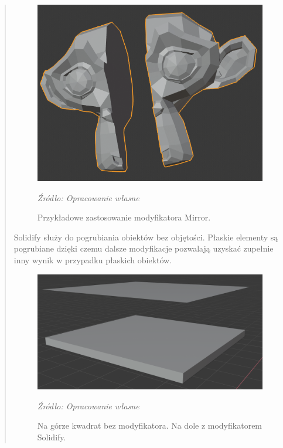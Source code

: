 \begin{quotation}
\begin{figure}[!hbt]
\centering
  \includegraphics[width=1\linewidth]{mirror.png}
  \caption{Przykładowe zastosowanie modyfikatora Mirror.}\label{rys_5}
  \begin{minipage}[t]{0.75\linewidth}
    \emph{Źródło: Opracowanie własne}
  \end{minipage}
\end{figure}

\newpage

\indent Solidify służy do pogrubiania obiektów bez objętości. Płaskie elementy są pogrubiane dzięki czemu dalsze modyfikacje pozwalają uzyskać zupełnie inny wynik w przypadku płaskich obiektów.
\begin{figure}[!hbt]
\centering
  \includegraphics[width=0.7\linewidth]{solidify.png}
  \caption{Na górze kwadrat bez modyfikatora. Na dole z modyfikatorem Solidify.}\label{rys_6}
  \begin{minipage}[t]{0.75\linewidth}
    \emph{Źródło: Opracowanie własne}
  \end{minipage}
\end{figure}


\end{quotation}
